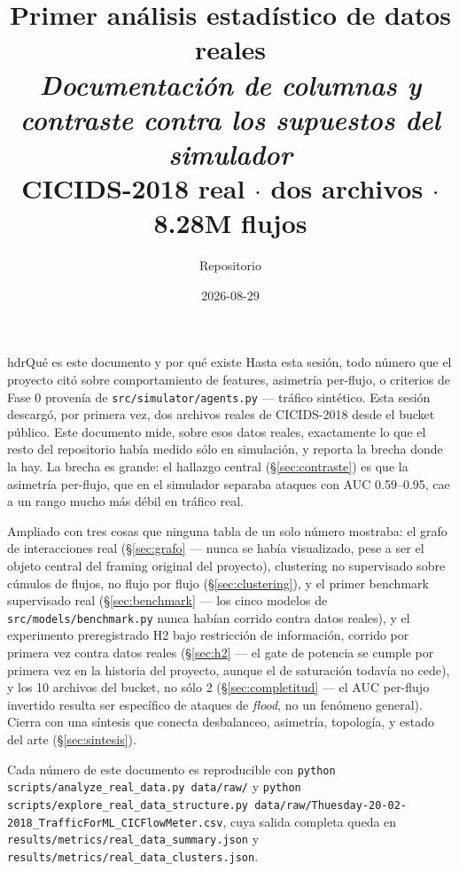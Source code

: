 \documentclass[11pt]{article}
\title{\textbf{\Large Primer análisis estadístico de datos reales}\\[4pt]
\Large \textit{Documentación de columnas y contraste contra los supuestos del simulador}\\[8pt]
\normalsize CICIDS-2018 real $\cdot$ dos archivos $\cdot$ 8.28M flujos}
\author{Repositorio \code{Ironsss/iag-symmetry}}
\date{2026-08-29}
\newcommand{\code}[1]{\texttt{\small #1}}
\begin{document}
\maketitle
\thispagestyle{empty}

\begin{cbox}{hdr}{Qué es este documento y por qué existe}
Hasta esta sesión, todo número que el proyecto citó sobre comportamiento de features,
asimetría per-flujo, o criterios de Fase 0 provenía de \code{src/simulator/agents.py}
--- tráfico sintético. Esta sesión descargó, por primera vez, dos archivos reales de
CICIDS-2018 desde el bucket público. Este documento mide, sobre esos datos reales,
exactamente lo que el resto del repositorio había medido sólo en simulación, y reporta
la brecha donde la hay. La brecha es grande: el hallazgo central (\S\ref{sec:contraste})
es que la asimetría per-flujo, que en el simulador separaba ataques con AUC 0.59--0.95,
cae a un rango mucho más débil en tráfico real.

\medskip
Ampliado con tres cosas que ninguna tabla de un solo número mostraba: el grafo de
interacciones real (\S\ref{sec:grafo} --- nunca se había visualizado, pese a ser el
objeto central del framing original del proyecto), clustering no supervisado sobre
cúmulos de flujos, no flujo por flujo (\S\ref{sec:clustering}), y el primer benchmark
supervisado real (\S\ref{sec:benchmark} --- los cinco modelos de
\code{src/models/benchmark.py} nunca habían corrido contra datos reales), y el experimento
preregistrado H2 bajo restricción de información, corrido por primera vez contra datos reales
(\S\ref{sec:h2} --- el gate de potencia se cumple por primera vez en la historia del proyecto,
aunque el de saturación todavía no cede), y los 10 archivos del bucket, no sólo 2
(\S\ref{sec:completitud} --- el AUC per-flujo invertido resulta ser específico de ataques de
\emph{flood}, no un fenómeno general). Cierra con una síntesis que conecta desbalanceo,
asimetría, topología, y estado del arte (\S\ref{sec:sintesis}).

\medskip
Cada número de este documento es reproducible con \code{python scripts/analyze\_real\_data.py
data/raw/} y \code{python scripts/explore\_real\_data\_structure.py data/raw/Thuesday-20-02-2018\_TrafficForML\_CICFlowMeter.csv},
cuya salida completa queda en \code{results/metrics/real\_data\_summary.json} y
\code{results/metrics/real\_data\_clusters.json}.
\end{cbox}

\tableofcontents
\newpage
\end{document}
